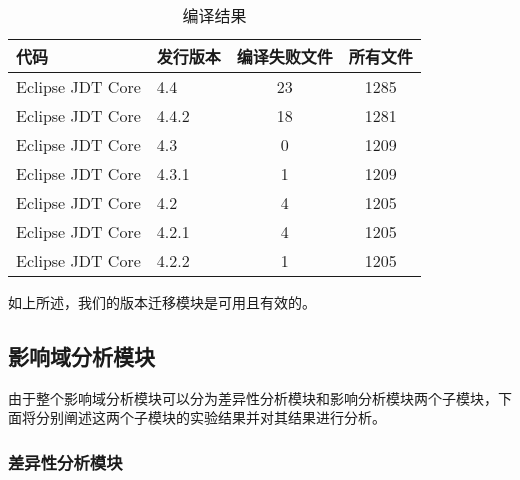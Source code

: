 \begin{table}
	\caption{编译结果}
	\label{data_git_merge2}
	\centering
	\begin{tabular}{llcc}
		\toprule[1.5pt]
		{\heiti 代码} & {\heiti 发行版本} & {\heiti 编译失败文件} & {\heiti 所有文件}\\\midrule[1pt]
		Eclipse JDT Core & 4.4 & 23 & 1285\\
		Eclipse JDT Core & 4.4.2 & 18 & 1281\\
		Eclipse JDT Core & 4.3 & 0 & 1209\\
		Eclipse JDT Core & 4.3.1 & 1 & 1209\\
		Eclipse JDT Core & 4.2 & 4 & 1205\\
		Eclipse JDT Core & 4.2.1 & 4 & 1205\\
		Eclipse JDT Core & 4.2.2 & 1 & 1205\\
		\bottomrule[1.5pt]
	\end{tabular}
\end{table}

如上所述，我们的版本迁移模块是可用且有效的。

%
%

\subsection{影响域分析模块}

由于整个影响域分析模块可以分为差异性分析模块和影响分析模块两个子模块，下面将分别阐述这两个子模块的实验结果并对其结果进行分析。

\subsubsection{差异性分析模块}

